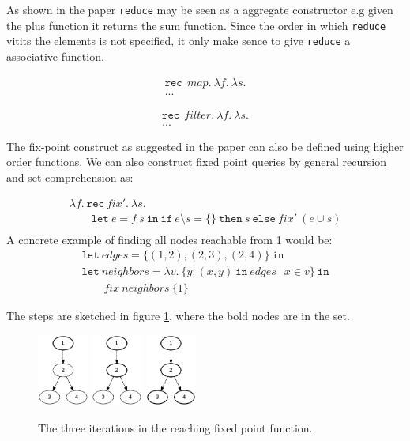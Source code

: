 \documentclass[a4paper]{article}
\newcommand{\code}[1]{{\tt #1}}
\newcommand{\pipe}{\ | \ }
\newcommand{\s}[1]{\mathtt{#1}}
\newcommand{\sLb}{\s{\{}}
\newcommand{\sRb}{\s{\}}}
\newcommand{\sif}{\s{if\ }}
\newcommand{\sthen}{\s{\ then\ }}
\newcommand{\selse}{\s{\ else\ }}
\newcommand{\sletin}[2]{\s{let\ } #1 \s{\ in\ } #2}
\newcommand{\srec}{\s{rec\ }}
\begin{document}
As shown in the paper \code{reduce} may be seen as a aggregate constructor e.g given the plus function it returns the sum function. Since the order in which \code{reduce} vitits the elements is not specified, it only make sence to give \code{reduce} a associative function.

\[\begin{array}{l}
\srec \  map.\ \lambda f.\ \lambda s.\\
...
\end{array}\]

\[\begin{array}{l}
\srec \  filter.\ \lambda f.\ \lambda s.\\
...
\end{array}\]


The fix-point construct as suggested in the paper can also be defined using higher order functions. We can also construct fixed point queries by general recursion and set comprehension as:

\[\begin{array}{l}
\lambda f.\ \srec fix'.\ \lambda s.\\
\quad\quad\sletin{e = f\ s}{\sif e \setminus s = \{\} \sthen s \selse fix'\ (e \cup s)} \\
\end{array}\]
A concrete example of finding all nodes reachable from 1 would be:
\[\begin{array}{l}
\s{let\ } edges = \{(1, 2), (2, 3), (2, 4)\} \s{\ in}\\
\s{let\ } neighbors = \lambda v.\ \sLb y : (x,y) \s{\ in\ } edges \pipe x\in v \sRb\ \s{in} \\
\quad\quad fix\ neighbors\  \{1\}
\end{array}\]

The steps are sketched in figure \ref{figure:graph},
where the bold nodes are in the set.

\begin{figure}[h]
\centering
\includegraphics[width=0.15\textwidth]{grapha.png}
\includegraphics[width=0.15\textwidth]{graphb.png}
\includegraphics[width=0.15\textwidth]{graphc.png}
\caption{The three iterations in the reaching fixed point function.}
\label{figure:graph}
\end{figure}
\end{document}
